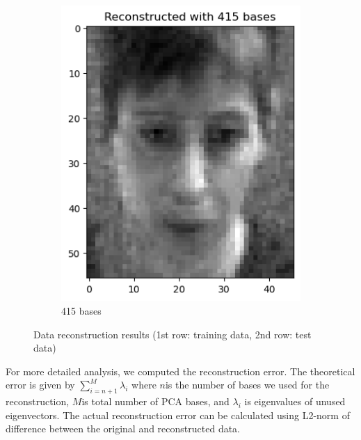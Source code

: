 \begin{figure}[htbp]
\begin{subfigure}[t]{0.2\linewidth}
		\includegraphics[width=\linewidth]{image/q1_recon_test_415.png}
		\caption{415 bases}
		\label{fig:test_re_415}
	\end{subfigure}
	\caption{Data reconstruction results (1st row: training data, 2nd row: test data)}
	\label{fig:recon_result}
\end{figure}
\vspace{-0.2cm}

For more detailed analysis, we computed the reconstruction error. The theoretical error is given by $\sum_{i=n+1}^M \lambda_i$ where $n$is the number of bases we used for the reconstruction, $M$is total number of PCA bases, and $\lambda_i$ is eigenvalues of unused eigenvectors. The actual reconstruction error can be calculated using L2-norm of difference between the original and reconstructed data.

